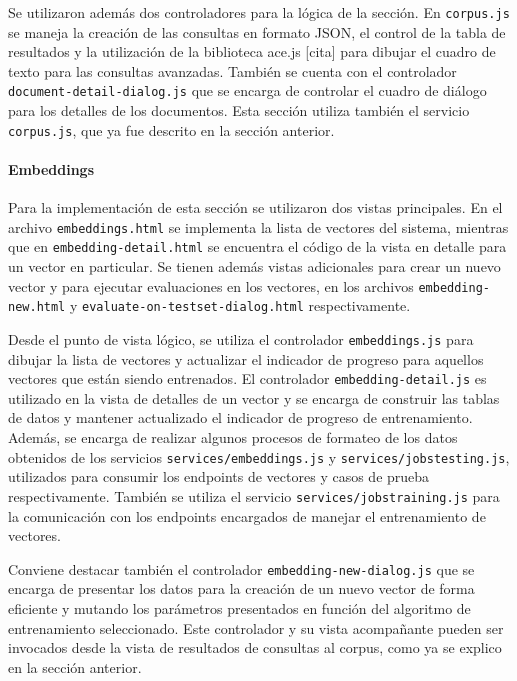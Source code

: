 Se utilizaron además dos controladores para la lógica de la sección. En \texttt{corpus.js} se maneja la
creación de las consultas en formato JSON, el control de la tabla de resultados y la utilización de la
biblioteca ace.js [cita] para dibujar el cuadro de texto para las consultas avanzadas. También se cuenta
con el controlador \texttt{document-detail-dialog.js} que se encarga de controlar el cuadro de diálogo
para los detalles de los documentos. Esta sección utiliza también el servicio \texttt{corpus.js}, que ya fue
descrito en la sección anterior.

\paragraph{Embeddings}

Para la implementación de esta sección se utilizaron dos vistas principales. En el archivo
\texttt{embeddings.html} se implementa la lista de vectores del sistema, mientras que en
\texttt{embedding-detail.html} se encuentra el código de la vista en detalle para un vector en particular.
Se tienen además vistas adicionales para crear un nuevo vector y para ejecutar evaluaciones en los vectores,
en los archivos \texttt{embedding-new.html} y \texttt{evaluate-on-testset-dialog.html} respectivamente.

Desde el punto de vista lógico, se utiliza el controlador \texttt{embeddings.js} para dibujar la lista de
vectores  y actualizar el indicador de progreso para aquellos vectores que están siendo entrenados. El
controlador \texttt{embedding-detail.js} es utilizado en la vista de detalles de un vector y se encarga de
construir las tablas de datos y mantener actualizado el indicador de progreso de entrenamiento. Además, se
encarga de realizar algunos procesos de formateo de los datos obtenidos de los servicios
\texttt{services/embeddings.js} y \texttt{services/jobstesting.js}, utilizados para consumir los endpoints
de vectores y casos de prueba respectivamente. También se utiliza el servicio
\texttt{services/jobstraining.js} para la comunicación con los endpoints encargados de manejar el
entrenamiento de vectores.

Conviene destacar también el controlador \texttt{embedding-new-dialog.js} que se encarga de presentar los
datos para la creación de un nuevo vector de forma eficiente y mutando los parámetros presentados en función
del algoritmo de entrenamiento seleccionado. Este controlador y su vista acompañante pueden ser invocados
desde la vista de resultados de consultas al corpus, como ya se explico en la sección anterior.

